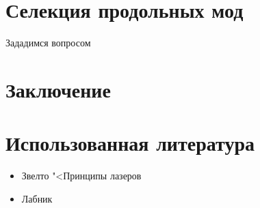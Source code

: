 \documentclass[12pt]{kiarticle}
\begin{document}
\section{Селекция продольных мод}

Зададимся вопросом 


\newpage
\section{Заключение}

\section*{Использованная литература}

\begin{itemize}
	
	\item Звелто "<Принципы лазеров
	
	\item Лабник
	
\end{itemize}
\end{document}
